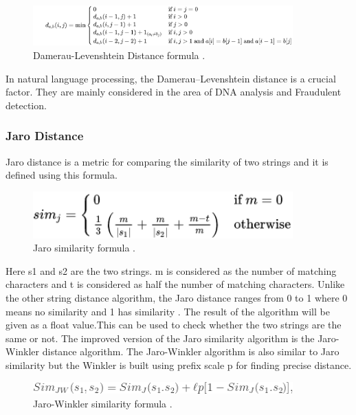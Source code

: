 \begin{figure}[h!]
	\includegraphics[width=10cm]{includes/dlevidist.png}
	\centering
	\caption{ Damerau-Levenshtein Distance formula \cite{DamLeven}.}
	\label{fig:dlevidist}
\end{figure}
In natural language processing, the Damerau–Levenshtein distance is a crucial factor. They are mainly considered in the area of DNA analysis and Fraudulent detection.
\subsubsection{Jaro Distance}
Jaro distance is a metric for comparing the similarity of two strings and it is defined using this formula.

\begin{figure}[h!]
	\includegraphics[width=10cm]{includes/jaro.png}
	\centering
	\caption{ Jaro similarity formula \cite{JaroWinkler}.}
	\label{fig:jaro}
\end{figure}
Here s1 and s2 are the two strings. m is considered as the number of matching characters and t is considered as half the number of matching characters. Unlike the other string distance algorithm, the Jaro distance ranges from 0 to 1 where 0 means no similarity and 1 has similarity \cite{Ak2021}. The result of the algorithm will be given as a float value.This can be used to check whether the two strings are the same or not. 
The improved version of the Jaro similarity algorithm is the Jaro-Winkler distance algorithm. The Jaro-Winkler algorithm is also similar to Jaro similarity but the Winkler is built using prefix scale p for finding precise distance.

\begin{figure}[h!]
	\includegraphics[width=10cm]{includes/jarowinkler.png}
	\centering
	\caption{ Jaro-Winkler similarity formula \cite{Stat2021}.}
	\label{fig:jarowinkler}
\end{figure}